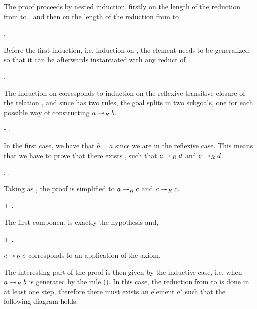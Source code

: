       The proof proceeds by nested induction, firstly on the length of
      the reduction from  to , and then on the length of the
      reduction from  to . \begin{coqdoccode}
\coqdocemptyline
\coqdocindent{1.00em}
  . \end{coqdoccode}
Before the first induction,
      i.e. induction on , the element  needs to be
      generalized so that it can be afterwards instantiated with any
      reduct of . \begin{coqdoccode}
\coqdocemptyline
\coqdocindent{1.00em}
 . \end{coqdoccode}
The induction on  corresponds to
       induction on the reflexive transitive closure of the relation
       , and since  has two rules, the goal splits in
       two subgoals, one for each possible way of constructing $a
       \twoheadrightarrow_R b$. \begin{coqdoccode}
\coqdocemptyline
\coqdocindent{1.00em}
-   . \end{coqdoccode}
In the first case, we have that $b = a$ since
    we are in the reflexive case. This means that we have to prove
    that there exists , such that $a \twoheadrightarrow_R d$ and $c \twoheadrightarrow_R d$. \begin{coqdoccode}
\coqdocemptyline
\coqdocindent{2.00em}
\coqdoctac{\ensuremath{\exists}} ; . \end{coqdoccode}
Taking  as , the proof is simplified to $a
    \twoheadrightarrow_R c$ and $c \twoheadrightarrow_R c$. \begin{coqdoccode}
\coqdocemptyline
\coqdocindent{2.00em}
+ . \end{coqdoccode}
The first component is exactly the hypothesis
         and, \begin{coqdoccode}
\coqdocemptyline
\coqdocindent{2.00em}
+  . \end{coqdoccode}
$c \twoheadrightarrow_R c$ corresponds to an application of
        the  axiom. \newline


        The interesting part of the proof is then given by the
        inductive case, i.e. when $a\twoheadrightarrow_R b$ is generated by the rule
        (). In this case, the reduction from  to  is
        done in at least one step, therefore there must exists an
        element $a'$ such that the following diagram holds.


